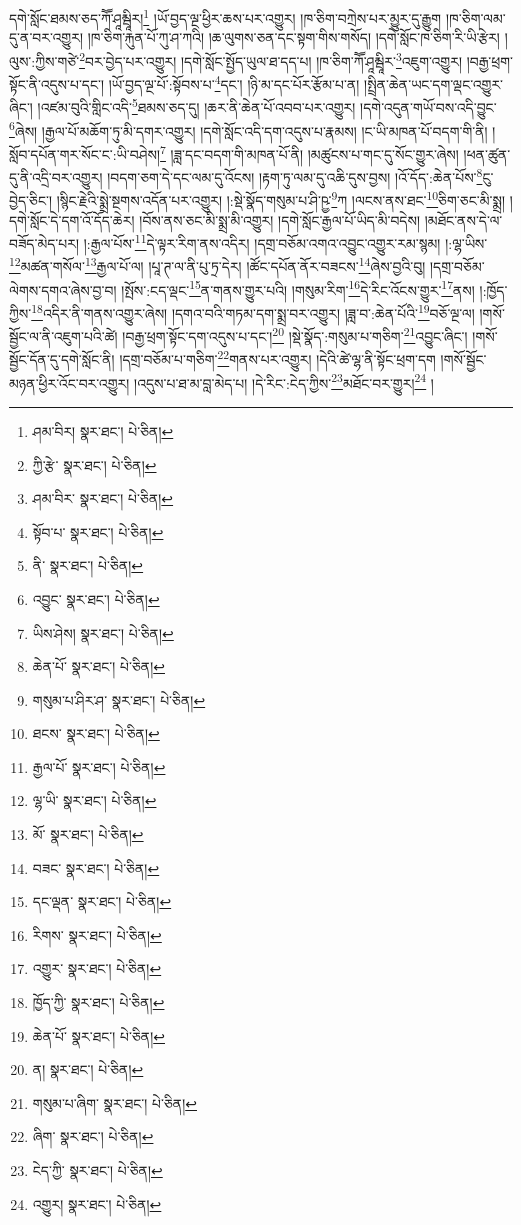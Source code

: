 དགེ་སློང་ཐམས་ཅད་ཀཽ་ཤཱམྦཱིར།\footnote{ཤམ་བིར།  སྣར་ཐང་།  པེ་ཅིན། } །ཡོ་བྱད་ལྔ་ཕྱིར་ཆས་པར་འགྱུར། །ཁ་ཅིག་བཀྲེས་པར་མྱུར་དུ་རྒྱུག །ཁ་ཅིག་ལམ་དུ་ན་བར་འགྱུར། །ཁ་ཅིག་རྐུན་པོ་ཀུ་ཤ་ཀའི། །ཆ་ལུགས་ཅན་དང་སྟག་གིས་གསོད། །དགེ་སློང་ཁ་ཅིག་རི་ཡི་རྩེར། །ལུས་:ཀྱིས་གཙེ་\footnote{ཀྱི་རྩེ་  སྣར་ཐང་།  པེ་ཅིན། }བར་བྱེད་པར་འགྱུར། །དགེ་སློང་སྤྱོད་ཡུལ་ཐ་དད་པ། །ཁ་ཅིག་ཀཽ་ཤཱམྦཱིར་\footnote{ཤམ་བིར་  སྣར་ཐང་།  པེ་ཅིན། }འཇུག་འགྱུར། །བརྒྱ་ཕྲག་སྟོང་ནི་འདུས་པ་དང་། །ཡོ་བྱད་ལྔ་པོ་:སྟོབས་པ་\footnote{སྟོབ་པ་  སྣར་ཐང་།  པེ་ཅིན། }དང་། །ཉི་མ་དང་པོར་རྩོམ་པ་ན། །སྤྲིན་ཆེན་ཡང་དག་ལྡང་འགྱུར་ཞིང་། །འཛམ་བུའི་གླིང་འདི་\footnote{ནི་  སྣར་ཐང་།  པེ་ཅིན། }ཐམས་ཅད་དུ། །ཆར་ནི་ཆེན་པོ་འབབ་པར་འགྱུར། །དགེ་འདུན་གཡོ་བས་འདི་བྱུང་\footnote{འབྱུང་  སྣར་ཐང་།  པེ་ཅིན། }ཞེས། །རྒྱལ་པོ་མཆོག་ཏུ་མི་དགར་འགྱུར། །དགེ་སློང་འདི་དག་འདུས་པ་རྣམས། །ང་ཡི་མཁན་པོ་བདག་གི་ནི། །སློབ་དཔོན་གར་སོང་ང་:ཡི་བཤེས།\footnote{ཡིས་ཤེས།  སྣར་ཐང་།  པེ་ཅིན། } །ཟླ་དང་བདག་གི་མཁན་པོ་ནི། །མཚུངས་པ་གང་དུ་སོང་གྱུར་ཞེས། །ཕན་ཚུན་དུ་ནི་འདྲི་བར་འགྱུར། །བདག་ཅག་དེ་དང་ལམ་དུ་འོངས། །རྟག་ཏུ་ལམ་དུ་འཆི་དུས་བྱས། །འོ་དོད་:ཆེན་པོས་\footnote{ཆེན་པོ་  སྣར་ཐང་།  པེ་ཅིན། }ངུ་བྱེད་ཅིང་། །སྙིང་རྗེའི་སྨྲེ་སྔགས་འདོན་པར་འགྱུར། །:སྡེ་སྣོད་གསུམ་པ་ཤི་ཥྱ་\footnote{གསུམ་པ་ཤིར་ཤ་  སྣར་ཐང་།  པེ་ཅིན། }ཀ །ལངས་ནས་ཐང་\footnote{ཐངས་  སྣར་ཐང་།  པེ་ཅིན། }ཅིག་ཅང་མི་སྨྲ། །དགེ་སློང་དེ་དག་འོ་དོད་ཆེར། །བོས་ནས་ཅང་མི་སྨྲ་མི་འགྱུར། །དགེ་སློང་རྒྱལ་པོ་ཡིད་མི་བདེས། །མཐོང་ནས་དེ་ལ་བཟོད་མེད་པར། །:རྒྱལ་པོས་\footnote{རྒྱལ་པོ་  སྣར་ཐང་།  པེ་ཅིན། }དེ་ལྟར་རིག་ནས་འདིར། །དགྲ་བཅོམ་འགའ་འབྱུང་འགྱུར་རམ་སྙམ། །:ལྷ་ཡིས་\footnote{ལྷ་ཡི་  སྣར་ཐང་།  པེ་ཅིན། }མཚན་གསོལ་\footnote{མོ་  སྣར་ཐང་།  པེ་ཅིན། }རྒྱལ་པོ་ལ། །པཱ་ཊ་ལ་ནི་པུ་ཏྲ་དེར། །ཚོང་དཔོན་ནོར་བཟངས་\footnote{བཟང་  སྣར་ཐང་།  པེ་ཅིན། }ཞེས་བྱའི་བུ། །དགྲ་བཅོམ་ལེགས་དགའ་ཞེས་བྱ་བ། །སྤོས་:ངད་ལྡང་\footnote{དང་ལྡན་  སྣར་ཐང་།  པེ་ཅིན། }ན་གནས་གྱུར་པའི། །གསུམ་རིག་\footnote{རིགས་  སྣར་ཐང་།  པེ་ཅིན། }དེ་རིང་འོངས་གྱུར་\footnote{འགྱུར་  སྣར་ཐང་།  པེ་ཅིན། }ནས། །:ཁྱོད་ཀྱིས་\footnote{ཁྱོད་ཀྱི་  སྣར་ཐང་།  པེ་ཅིན། }འདིར་ནི་གནས་འགྱུར་ཞེས། །དགའ་བའི་གཏམ་དག་སྨྲ་བར་འགྱུར། །ཟླ་བ་:ཆེན་པོའི་\footnote{ཆེན་པོ་  སྣར་ཐང་།  པེ་ཅིན། }བཅོ་ལྔ་ལ། །གསོ་སྦྱོང་ལ་ནི་འཇུག་པའི་ཚེ། །བརྒྱ་ཕྲག་སྟོང་དག་འདུས་པ་དང་།\footnote{ན།  སྣར་ཐང་།  པེ་ཅིན། } །སྡེ་སྣོད་:གསུམ་པ་གཅིག་\footnote{གསུམ་པ་ཞིག་  སྣར་ཐང་།  པེ་ཅིན། }འབྱུང་ཞིང་། །གསོ་སྦྱོང་དོན་དུ་དགེ་སློང་ནི། །དགྲ་བཅོམ་པ་གཅིག་\footnote{ཞིག་  སྣར་ཐང་།  པེ་ཅིན། }གནས་པར་འགྱུར། །དེའི་ཚེ་ལྷ་ནི་སྟོང་ཕྲག་དག །གསོ་སྦྱོང་མཉན་ཕྱིར་འོང་བར་འགྱུར། །འདུས་པ་ཐ་མ་བླ་མེད་པ། །དེ་རིང་:ངེད་ཀྱིས་\footnote{ངེད་ཀྱི་  སྣར་ཐང་།  པེ་ཅིན། }མཐོང་བར་གྱུར།\footnote{འགྱུར།  སྣར་ཐང་།  པེ་ཅིན། } །
